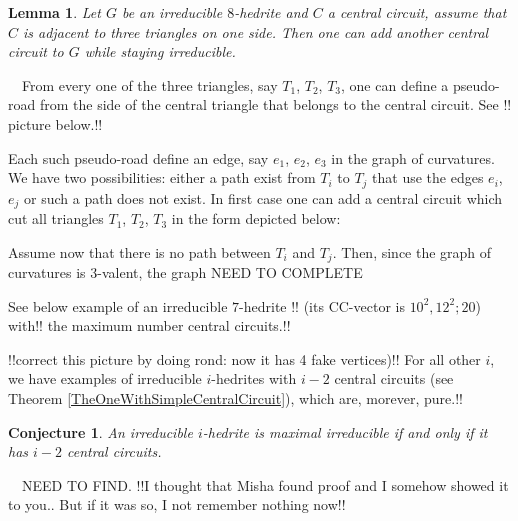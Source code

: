 \documentclass[12pt]{article}
\newtheorem{conjecture}{Conjecture}
\newtheorem{lemma}{Lemma}
\newcommand{\proof}{\noindent{\bf Proof.}\ \ }
\begin{document}
\begin{lemma}
Let $G$ be an irreducible $8$-hedrite and $C$ a central circuit, assume that $C$ is adjacent to three triangles on one side. Then one can add another central circuit to $G$ while staying irreducible.
\end{lemma}
\proof From every one of the three triangles, say $T_1$, $T_2$, $T_3$, one can define a pseudo-road from the side of the central triangle that belongs to the central circuit. See !! picture below.!!
\begin{center}
\epsfxsize=40mm
\end{center}
Each such pseudo-road define an edge, say $e_1$, $e_2$, $e_3$ in the graph 
of curvatures. We have two possibilities: either a path exist from $T_i$ 
to $T_j$ that use the edges $e_i$, $e_j$ or such a path does not exist. In 
first case one can add a central circuit which cut all triangles $T_1$, 
$T_2$, $T_3$ in the form depicted below:
\begin{center}
\epsfxsize=40mm
\end{center}

Assume now that there is no path between $T_i$ and $T_j$. Then, since the graph of curvatures is $3$-valent, the graph NEED TO COMPLETE













See below example of an irreducible $7$-hedrite 
!! (its CC-vector is $10^2,12^2;20$) with!!
the maximum number central circuits.!!

\begin{center}
\epsfxsize=60mm
\end{center}
!!correct this picture by doing rond: now it has 4 fake vertices)!!
For all other $i$, 
we have examples of irreducible $i$-hedrites with $i-2$ central 
circuits (see Theorem \ref{TheOneWithSimpleCentralCircuit}), 
which are, morever, pure.!!















\begin{conjecture}
An irreducible $i$-hedrite is maximal irreducible if and only if it has $i-2$ central circuits.
\end{conjecture}
\proof NEED TO FIND.
!!I thought that Misha found proof and I somehow showed it to you..
But if it was so, I not remember nothing now!!
\end{document}
